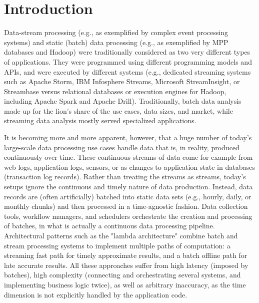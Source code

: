 \documentclass[11pt]{article}
\begin{document}


\section{Introduction}
\label{sec:intro}
\vspace{-3mm}
Data-stream processing (e.g., as exemplified by complex event processing systems) and static (batch) data processing (e.g., as exemplified by MPP databases and Hadoop) were traditionally considered as two very different types of applications. They were programmed using different programming models and APIs, and were executed by different systems (e.g., dedicated streaming systems such as  Apache Storm, IBM Infosphere Streams, Microsoft StreamInsight, or Streambase versus relational databases or execution engines for Hadoop, including Apache Spark and Apache Drill). Traditionally, batch data analysis made up for the lion's share of the use cases, data sizes, and market, while streaming data analysis mostly served specialized applications.

It is becoming more and more apparent, however, that a huge number of today's large-scale data processing use cases handle data that is, in reality, produced continuously over time. These continuous streams of data come for example from web logs, application logs, sensors, or as changes to application state in databases (transaction log records). Rather than treating the streams as streams, today's setups ignore the continuous and timely nature of data production. Instead, data records are (often artificially) batched into static data sets (e.g., hourly, daily, or monthly chunks) and then processed in a time-agnostic fashion. Data collection tools, workflow managers, and schedulers orchestrate the creation and processing of batches, in what is actually a continuous data processing pipeline. Architectural patterns such as the "lambda architecture" \cite{marz2015big} combine batch and stream processing systems to implement multiple paths of computation: a streaming fast path for timely approximate results, and a batch offline path for late accurate results. All these approaches suffer from high latency (imposed by batches), high complexity (connecting and orchestrating several systems, and implementing business logic twice), as well as arbitrary inaccuracy, as the time dimension is not explicitly handled by the application code.
\end{document}
